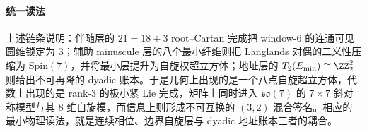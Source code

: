 \paragraph{统一读法}
上述链条说明：伴随层的 \(21=18+3\) root--Cartan 完成把 window-\(6\) 的连通可见圆维锁定为 \(3\)；辅助 minuscule 层的八个最小纤维则把 Langlands 对偶的二义性压缩为 \(\mathrm{Spin}(7)\)，并将最小层提升为自旋权超立方体；地址层的 \(T_2(E_{\min})\cong \ZZ_2^2\) 则给出不可再降的 dyadic 账本。于是几何上出现的是一个八点自旋超立方体，代数上出现的是 rank-\(3\) 的极小紧 Lie 完成，矩阵上同时进入 \(\mathfrak{so}(7)\) 的 \(7\times 7\) 斜对称模型与其 \(8\) 维自旋模，而信息上则形成不可互换的 \((3,2)\) 混合签名。相应的最小物理读法，就是连续相位、边界自旋层与 dyadic 地址账本三者的耦合。

\endinput
